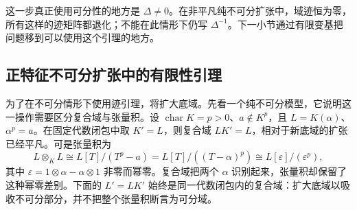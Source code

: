 这一步真正使用可分性的地方是 \(\Delta\ne0\)。在非平凡纯不可分扩张中，域迹恒为零，所有这样的迹矩阵都退化；不能在此情形下仍写 \(\Delta^{-1}\)。下一小节通过有限变基把问题移到可以使用这个引理的地方。

\subsection{正特征不可分扩张中的有限性引理}
\label{b3:subsec:0605:03}

为了在不可分情形下使用迹引理，将扩大底域。先看一个纯不可分模型，它说明这一操作需要区分复合域与张量积。设 \(\operatorname{char}K=p>0\)、\(a\notin K^p\)，且 \(L=K(\alpha)\)、\(\alpha^p=a\)。在固定代数闭包中取 \(K'=L\)，则复合域 \(LK'=L\)，相对于新底域的扩张已经平凡。可是张量积为
\[
	L\otimes_KL\cong L[T]/(T^p-a) =L[T]/((T-\alpha)^p) \cong L[\varepsilon]/(\varepsilon^p),
\]
其中 \(\varepsilon=1\otimes\alpha-\alpha\otimes1\) 非零而幂零。复合域把两个 \(\alpha\) 识别起来，张量积却保留了这种幂零差别。下面的 \(L'=LK'\) 始终是同一代数闭包内的复合域：扩大底域以吸收不可分部分，并不把整个张量积断言为可分域。

